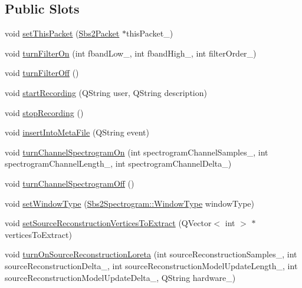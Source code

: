 \subsection*{Public Slots}
\begin{DoxyCompactItemize}
\item 
void \hyperlink{classSbs2DataHandler_a0f7ac4379cc87dc4f84b764e810a2428}{set\-This\-Packet} (\hyperlink{classSbs2Packet}{Sbs2\-Packet} $\ast$this\-Packet\-\_\-)
\item 
void \hyperlink{classSbs2DataHandler_ae44b39aab30a6caa6768dfabad5d9e1b}{turn\-Filter\-On} (int fband\-Low\-\_\-, int fband\-High\-\_\-, int filter\-Order\-\_\-)
\item 
void \hyperlink{classSbs2DataHandler_a51df4501ee7314fe744acc098af30ee0}{turn\-Filter\-Off} ()
\item 
void \hyperlink{classSbs2DataHandler_ae45981d8b359448d850bb122376bbbb5}{start\-Recording} (Q\-String user, Q\-String description)
\item 
void \hyperlink{classSbs2DataHandler_a245b243ee7654d4e5bd506cd28a1d93b}{stop\-Recording} ()
\item 
void \hyperlink{classSbs2DataHandler_a79823cb73dcb66e0cf63d8892e906f75}{insert\-Into\-Meta\-File} (Q\-String event)
\item 
void \hyperlink{classSbs2DataHandler_ae4782ab78c11ceeda69a51cf7aec8c00}{turn\-Channel\-Spectrogram\-On} (int spectrogram\-Channel\-Samples\-\_, int spectrogram\-Channel\-Length\-\_, int spectrogram\-Channel\-Delta\-\_)
\item 
void \hyperlink{classSbs2DataHandler_ac949d6a7a1003dd908419369d1de4f22}{turn\-Channel\-Spectrogram\-Off} ()
\item 
void \hyperlink{classSbs2DataHandler_a0c6604942e87bf2690e8e6d48273559c}{set\-Window\-Type} (\hyperlink{classSbs2Spectrogram_a22265347883488b8385c83b67882d915}{Sbs2\-Spectrogram\-::\-Window\-Type} window\-Type)
\item 
void \hyperlink{classSbs2DataHandler_a2dfb1e3c5ad349c5a2c0f0271ab5d430}{set\-Source\-Reconstruction\-Vertices\-To\-Extract} (Q\-Vector$<$ int $>$ $\ast$vertices\-To\-Extract)
\item 
void \hyperlink{classSbs2DataHandler_a390b4440892561c1484e5c7a2ba6774b}{turn\-On\-Source\-Reconstruction\-Loreta} (int source\-Reconstruction\-Samples\-\_\-, int source\-Reconstruction\-Delta\-\_\-, int source\-Reconstruction\-Model\-Update\-Length\-\_\-, int source\-Reconstruction\-Model\-Update\-Delta\-\_\-, Q\-String hardware\-\_\-)
\item 

\end{DoxyCompactItemize}
